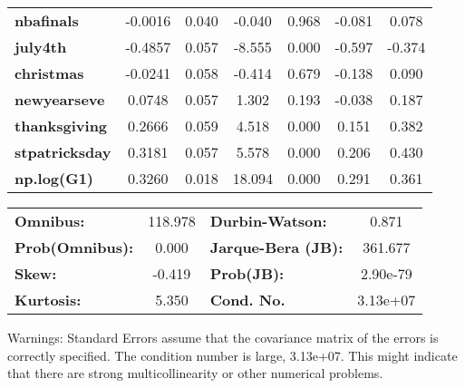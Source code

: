 \begin{center}
\begin{tabular}{lcccccc}
\textbf{nbafinals}                         &      -0.0016  &        0.040     &    -0.040  &         0.968        &       -0.081    &        0.078     \\
\textbf{july4th}                           &      -0.4857  &        0.057     &    -8.555  &         0.000        &       -0.597    &       -0.374     \\
\textbf{christmas}                         &      -0.0241  &        0.058     &    -0.414  &         0.679        &       -0.138    &        0.090     \\
\textbf{newyearseve}                       &       0.0748  &        0.057     &     1.302  &         0.193        &       -0.038    &        0.187     \\
\textbf{thanksgiving}                      &       0.2666  &        0.059     &     4.518  &         0.000        &        0.151    &        0.382     \\
\textbf{stpatricksday}                     &       0.3181  &        0.057     &     5.578  &         0.000        &        0.206    &        0.430     \\
\textbf{np.log(G1)}                        &       0.3260  &        0.018     &    18.094  &         0.000        &        0.291    &        0.361     \\
\bottomrule
\end{tabular}
\begin{tabular}{lclc}
\textbf{Omnibus:}       & 118.978 & \textbf{  Durbin-Watson:     } &    0.871  \\
\textbf{Prob(Omnibus):} &   0.000 & \textbf{  Jarque-Bera (JB):  } &  361.677  \\
\textbf{Skew:}          &  -0.419 & \textbf{  Prob(JB):          } & 2.90e-79  \\
\textbf{Kurtosis:}      &   5.350 & \textbf{  Cond. No.          } & 3.13e+07  \\
\bottomrule
\end{tabular}
\end{center}

Warnings: \newline
 [1] Standard Errors assume that the covariance matrix of the errors is correctly specified. \newline
 [2] The condition number is large, 3.13e+07. This might indicate that there are \newline
 strong multicollinearity or other numerical problems.